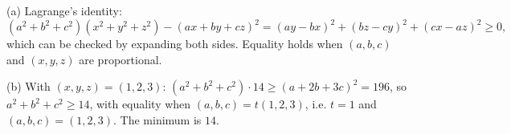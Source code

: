 (a) Lagrange's identity:
\[(a^2+b^2+c^2)(x^2+y^2+z^2)-(ax+by+cz)^2=(ay-bx)^2+(bz-cy)^2+(cx-az)^2\ge0,\]
which can be checked by expanding both sides. Equality holds when $(a,b,c)$ and $(x,y,z)$ are proportional.

(b) With $(x,y,z)=(1,2,3)$: $(a^2+b^2+c^2)\cdot14\ge(a+2b+3c)^2=196$, so $a^2+b^2+c^2\ge14$, with equality when $(a,b,c)=t(1,2,3)$, i.e. $t=1$ and $(a,b,c)=(1,2,3)$. The minimum is $\boxed{14}$.
